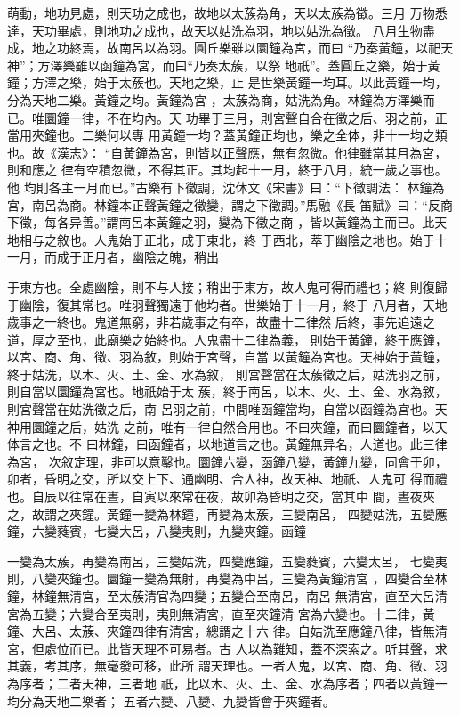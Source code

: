 \documentclass{ctexart}
\begin{document}
萌動，地功見處，則天功之成也，故地以太蔟為角，天以太蔟為徵。三月 万物悉達，天功畢處，則地功之成也，故天以姑洗為羽，地以姑洗為徵。 八月生物盡成，地之功終焉，故南呂以為羽。圓丘樂雖以圜鐘為宮，而曰 ``乃奏黃鐘，以祀天神''；方澤樂雖以函鐘為宮，而曰``乃奏太蔟，以祭 地祇''。蓋圓丘之樂，始于黃鐘；方澤之樂，始于太蔟也。天地之樂，止 是世樂黃鐘一均耳。以此黃鐘一均，分為天地二樂。黃鐘之均。黃鐘為宮 ，太蔟為商，姑洗為角。林鐘為方澤樂而已。唯圜鐘一律，不在均內。天 功畢于三月，則宮聲自合在徵之后、羽之前，正當用夾鐘也。二樂何以專 用黃鐘一均？蓋黃鐘正均也，樂之全体，非十一均之類也。故《漢志》： ``自黃鐘為宮，則皆以正聲應，無有忽微。他律雖當其月為宮，則和應之 律有空積忽微，不得其正。其均起十一月，終于八月，統一歲之事也。他 均則各主一月而已。''古樂有下徵調，沈休文《宋書》曰：``下徵調法： 林鐘為宮，南呂為商。林鐘本正聲黃鐘之徵變，謂之下徵調。''馬融《長 笛賦》曰：``反商下徵，每各异善。''謂南呂本黃鐘之羽，變為下徵之商 ，皆以黃鐘為主而已。此天地相与之敘也。人鬼始于正北，成于東北，終 于西北，萃于幽陰之地也。始于十一月，而成于正月者，幽陰之魄，稍出

于東方也。全處幽陰，則不与人接；稍出于東方，故人鬼可得而禮也；終 則復歸于幽陰，復其常也。唯羽聲獨遠于他均者。世樂始于十一月，終于 八月者，天地歲事之一終也。鬼道無窮，非若歲事之有卒，故盡十二律然 后終，事先追遠之道，厚之至也，此廟樂之始終也。人鬼盡十二律為義， 則始于黃鐘，終于應鐘，以宮、商、角、徵、羽為敘，則始于宮聲，自當 以黃鐘為宮也。天神始于黃鐘，終于姑洗，以木、火、土、金、水為敘， 則宮聲當在太蔟徵之后，姑洗羽之前，則自當以圜鐘為宮也。地祇始于太 蔟，終于南呂，以木、火、土、金、水為敘，則宮聲當在姑洗徵之后，南 呂羽之前，中間唯函鐘當均，自當以函鐘為宮也。天神用圜鐘之后，姑洗 之前，唯有一律自然合用也。不曰夾鐘，而曰圜鐘者，以天体言之也。不 曰林鐘，曰函鐘者，以地道言之也。黃鐘無异名，人道也。此三律為宮， 次敘定理，非可以意鑿也。圜鐘六變，函鐘八變，黃鐘九變，同會于卯， 卯者，昏明之交，所以交上下、通幽明、合人神，故天神、地祇、人鬼可 得而禮也。自辰以往常在晝，自寅以來常在夜，故卯為昏明之交，當其中 間，晝夜夾之，故謂之夾鐘。黃鐘一變為林鐘，再變為太蔟，三變南呂， 四變姑洗，五變應鐘，六變蕤賓，七變大呂，八變夷則，九變夾鐘。函鐘

一變為太蔟，再變為南呂，三變姑洗，四變應鐘，五變蕤賓，六變太呂， 七變夷則，八變夾鐘也。圜鐘一變為無射，再變為中呂，三變為黃鐘清宮 ，四變合至林鐘，林鐘無清宮，至太蔟清官為四變；五變合至南呂，南呂 無清宮，直至大呂清宮為五變；六變合至夷則，夷則無清宮，直至夾鐘清 宮為六變也。十二律，黃鐘、大呂、太蔟、夾鐘四律有清宮，總謂之十六 律。自姑洗至應鐘八律，皆無清宮，但處位而已。此皆天理不可易者。古 人以為難知，蓋不深索之。听其聲，求其義，考其序，無毫發可移，此所 謂天理也。一者人鬼，以宮、商、角、徵、羽為序者；二者天神，三者地 祇，比以木、火、土、金、水為序者；四者以黃鐘一均分為天地二樂者； 五者六變、八變、九變皆會于夾鐘者。
\end{document}
